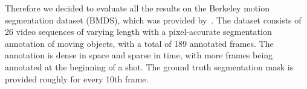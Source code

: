 Therefore we decided to evaluate all the results on the Berkeley motion segmentation dataset (BMDS), which was provided by~\cite{Brox10}. The dataset consists of 26 video sequences of varying length with a pixel-accurate segmentation annotation of 
moving objects, with a total of 189 annotated frames. The annotation is dense in space and sparse in time, with more frames being annotated at the beginning of a shot. The ground truth segmentation
mask is provided roughly for every 10th frame.
\begin{figure}[h]
 \centering


\end{figure}
